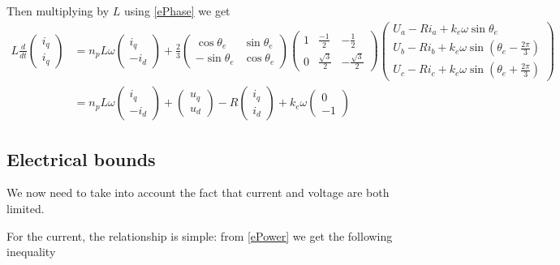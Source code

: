 \documentclass[a4paper,10pt]{article}
\begin{document}
Then multiplying by $L$ using \eqref{ePhase} we get
\begin{equation}
	\begin{aligned}
	L \frac{d}{dt}
	\begin{pmatrix}
		i_q \\
		i_q
	\end{pmatrix} &= n_p L \omega \begin{pmatrix} i_q \\ -i_d \end{pmatrix} 
		+ \frac{2}{3} \begin{pmatrix}
		\cos \theta_e & \sin \theta_e \\
		-\sin \theta_e & \cos \theta_e
	\end{pmatrix} \begin{pmatrix}
		1 & \frac{-1}{2} & - \frac{1}{2} \\
		0 & \frac{\sqrt{3}}{2}& - \frac{\sqrt{3}}{2}
	\end{pmatrix}
	\begin{pmatrix}
		U_a - R i_a + k_e \omega \sin \theta_e \\
		U_b - R i_b + k_e \omega \sin (\theta_e - \frac{2 \pi}{3})\\
		U_c - R i_c + k_e \omega \sin (\theta_e + \frac{2 \pi}{3})
	\end{pmatrix}\\
	&= n_p L \omega \begin{pmatrix} i_q \\ -i_d \end{pmatrix} 
	 + \begin{pmatrix} u_q \\ u_d \end{pmatrix}
	 - R \begin{pmatrix} i_q \\ i_d \end{pmatrix}
	 +  k_e \omega \begin{pmatrix} 0 \\ -1 \end{pmatrix}
	\end{aligned}
\end{equation}

\subsection{Electrical bounds}

We now need to take into account the fact that current and voltage are both limited.

For the current, the relationship is simple: from \eqref{ePower} we get the following inequality
\end{document}
